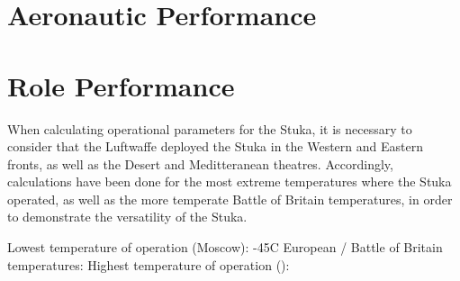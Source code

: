 \documentclass[a4paper, fontsize=11pt]{scrartcl} %
\begin{document}
\section{Aeronautic Performance}

\section{Role Performance}
When calculating operational parameters for the Stuka, it is necessary
to consider that the Luftwaffe deployed the Stuka in the Western and
Eastern fronts, as well as the Desert and Meditteranean theatres.
Accordingly, calculations have been done for the most extreme
temperatures where the Stuka operated, as well as the more temperate
Battle of Britain temperatures, in order to demonstrate the versatility
of the Stuka.

Lowest temperature of operation (Moscow): -45C \autocite{raus03}
European / Battle of Britain temperatures:
Highest temperature of operation ():


\printbibliography
\end{document}
